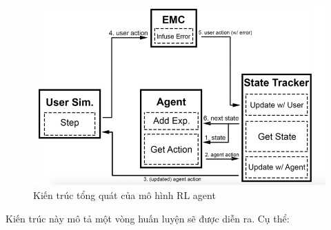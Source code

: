 \begin{figure}[ht]
    \centering
    \includegraphics[width=1\textwidth]{thesis/chatbot-outline/phuongphap/agentmodel.png}
    \caption{Kiến trúc tổng quát của mô hình RL agent}
    \label{fig:agentmodel}
\end{figure}

Kiến trúc này mô tả một vòng huấn luyện sẽ được diễn ra. Cụ thể:

